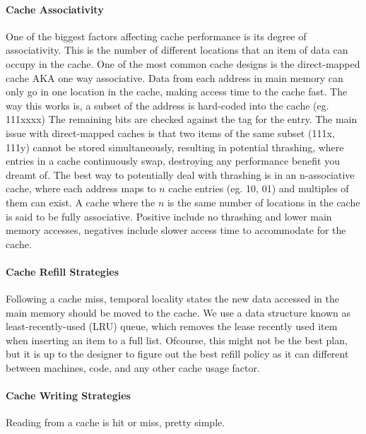 \paragraph{Cache Associativity} One of the biggest factors affecting cache performance is its degree of associativity. This is the number of different locations that an item of data can occupy in the cache. One of the most common cache designs is the direct-mapped cache AKA one way associative. Data from each address in main memory can only go in one location in the cache, making access time to the cache fast. The way this works is, a subset of the address is hard-coded into the cache (eg. 111xxxx) The remaining bits are checked against the tag for the entry. \newline
The main issue with direct-mapped caches is that two items of the same subset (111x, 111y) cannot be stored simultaneously, resulting in potential thrashing, where entries in a cache continuously swap, destroying any performance benefit you dreamt of. The best way to potentially deal with thrashing is in an n-associative cache, where each address maps to $n$ cache entries (eg. 10, 01) and multiples of them can exist. A cache where the $n$ is the same number of locations in the cache is said to be fully associative. Positive include no thrashing and lower main memory accesses, negatives include slower access time to accommodate for the cache.
\paragraph{Cache Refill Strategies}
Following a cache miss, temporal locality states the new data accessed in the main memory should be moved to the cache. We use a data structure known as least-recently-used (LRU) queue, which removes the lease recently used item when inserting an item to a full list. Ofcourse, this might not be the best plan, but it is up to the designer to figure out the best refill policy as it can different between machines, code, and any other cache usage factor.
\paragraph{Cache Writing Strategies}
Reading from a cache is hit or miss, pretty simple. 
